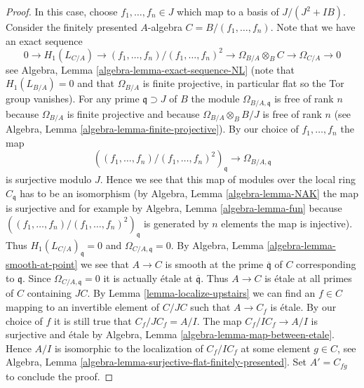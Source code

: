 \begin{proof}
\medskip\noindent
In this case, choose $f_1, \ldots, f_n \in J$ which map to a
basis of $J/(J^2 + IB)$. Consider the finitely presented $A$-algebra
$C = B/(f_1, \ldots, f_n)$. Note that we have an exact sequence
$$
0 \to H_1(L_{C/A}) \to (f_1, \ldots, f_n)/(f_1, \ldots, f_n)^2
\to \Omega_{B/A} \otimes_B C \to \Omega_{C/A} \to 0
$$
see Algebra, Lemma \ref{algebra-lemma-exact-sequence-NL} (note that
$H_1(L_{B/A}) = 0$ and that $\Omega_{B/A}$ is finite projective,
in particular flat so the Tor group vanishes). For any prime
$\mathfrak q \supset J$ of $B$ the module $\Omega_{B/A, \mathfrak q}$
is free of rank $n$ because $\Omega_{B/A}$ is finite projective and
because $\Omega_{B/A} \otimes_B B/J$ is free of rank $n$
(see Algebra, Lemma \ref{algebra-lemma-finite-projective}). By our choice
of $f_1, \ldots, f_n$ the map
$$
\left((f_1, \ldots, f_n)/(f_1, \ldots, f_n)^2\right)_{\mathfrak q}
\to
\Omega_{B/A, \mathfrak q}
$$
is surjective modulo $J$. Hence we see that this map of modules over
the local ring $C_{\mathfrak q}$ has to be an isomorphism
(by Algebra, Lemma \ref{algebra-lemma-NAK} the map is surjective
and for example by Algebra, Lemma \ref{algebra-lemma-fun}
because $((f_1, \ldots, f_n)/(f_1, \ldots, f_n)^2)_{\mathfrak q}$
is generated by $n$ elements the map is injective). Thus
$H_1(L_{C/A})_{\mathfrak q} = 0$ and $\Omega_{C/A, \mathfrak q} = 0$. By
Algebra, Lemma \ref{algebra-lemma-smooth-at-point}
we see that $A \to C$ is smooth at the prime $\overline{\mathfrak q}$
of $C$ corresponding to $\mathfrak q$. Since
$\Omega_{C/A, \mathfrak q} = 0$ it is actually \'etale at
$\overline{\mathfrak q}$. Thus $A \to C$ is \'etale at all primes
of $C$ containing $JC$. By Lemma \ref{lemma-localize-upstairs}
we can find an $f \in C$ mapping to an invertible element of $C/JC$ such that
$A \to C_f$ is \'etale. By our choice of $f$ it is still true that
$C_f/JC_f = A/I$. The map $C_f/IC_f \to A/I$ is surjective and
\'etale by Algebra, Lemma \ref{algebra-lemma-map-between-etale}.
Hence $A/I$ is isomorphic to the localization of $C_f/IC_f$ at
some element $g \in C$, see
Algebra, Lemma \ref{algebra-lemma-surjective-flat-finitely-presented}.
Set $A' = C_{fg}$ to conclude the proof.
\end{proof}
